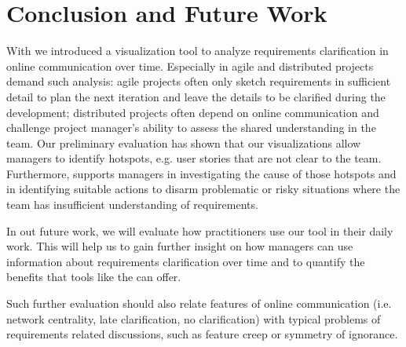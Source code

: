 \section{Conclusion and Future Work}
With \viss we introduced a visualization tool to analyze requirements clarification in online communication over time.
Especially in agile and distributed projects demand such analysis: agile projects often only sketch requirements in sufficient detail to plan the next iteration and leave the details to be clarified during the development; distributed projects often depend on online communication and challenge project manager's ability to assess the shared understanding in the team. 
Our preliminary evaluation has shown that our visualizations allow managers to identify hotspots, e.g. user stories that are not clear to the team. 
Furthermore, \viss supports managers in investigating the cause of those hotspots and in identifying suitable actions to disarm problematic or risky situations where the team has insufficient understanding of requirements.
 
In out future work, we will evaluate how practitioners use our tool in their daily work. 
This will help us to gain further insight on how managers can use information about requirements clarification over time and to quantify the benefits that tools like the \viss can offer.

Such further evaluation should also relate features of online communication (i.e. network centrality, late clarification, no clarification) with typical problems of requirements related discussions, such as feature creep or symmetry of ignorance.